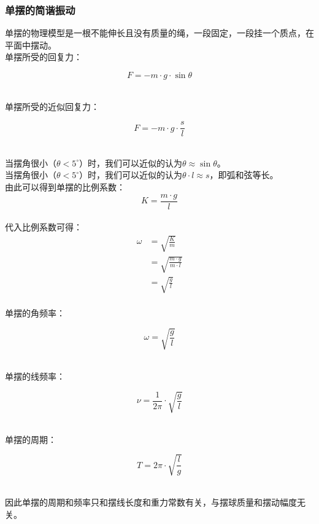 \documentclass[UTF8]{ctexart}
\begin{document}
\subsubsection{单摆的简谐振动}
    单摆的物理模型是一根不能伸长且没有质量的绳，一段固定，一段挂一个质点，在平面中摆动。\\[3mm]
    单摆所受的回复力：
    \begin{large}
        \begin{equation*}
            F=-m\cdot g\cdot \sin{\theta}
        \end{equation*}
    \end{large}\\
    单摆所受的近似回复力：
    \begin{large}
        \begin{equation*}
            F=-m\cdot g\cdot \frac{s}{l}
        \end{equation*}
    \end{large}\\
    当摆角很小（$\theta<5^{\circ}$）时，我们可以近似的认为$\theta\approx\sin{\theta}$。\\[3mm]
    当摆角很小（$\theta<5^{\circ}$）时，我们可以近似的认为$\theta\cdot l\approx s$，即弧和弦等长。\\[5mm]
    由此可以得到单摆的比例系数：\vspace{5pt}
    \begin{equation}
        K=\frac{m\cdot g}{l}
    \end{equation}\\
    代入比例系数可得：
    \begin{align}
        \omega
        &=\sqrt{\frac{K}{m}}\\[5mm]
        &=\sqrt{\frac{m\cdot g}{m\cdot l}}\\[5mm]
        &=\sqrt{\frac{g}{l}}
    \end{align}\\
    单摆的角频率：
    \begin{large}
        \begin{equation*}
            \omega=\sqrt{\frac{g}{l}}
        \end{equation*}
    \end{large}\\
    单摆的线频率：
    \begin{large}
        \begin{equation*}
            \nu=\frac{1}{2\pi}\cdot\sqrt{\frac{g}{l}}
        \end{equation*}
    \end{large}\\
    单摆的周期：
    \begin{large}
        \begin{equation*}
            T=2\pi\cdot\sqrt{\frac{l}{g}}
        \end{equation*}
    \end{large}\\
    因此单摆的周期和频率只和摆线长度和重力常数有关，与摆球质量和摆动幅度无关。
\end{document}
